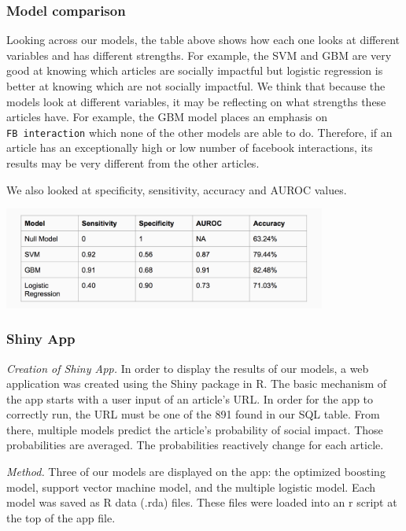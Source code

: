 \documentclass[10pt,letterpaper]{article}
\begin{document}
\hypertarget{model-comparison}{%
\subsubsection{Model comparison}\label{model-comparison}}

Looking across our models, the table above shows how each one looks at
different variables and has different strengths. For example, the SVM
and GBM are very good at knowing which articles are socially impactful
but logistic regression is better at knowing which are not socially
impactful. We think that because the models look at different variables,
it may be reflecting on what strengths these articles have. For example,
the GBM model places an emphasis on \texttt{FB\ interaction} which none
of the other models are able to do. Therefore, if an article has an
exceptionally high or low number of facebook interactions, its results
may be very different from the other articles.

We also looked at specificity, sensitivity, accuracy and AUROC values.

\includegraphics[width=401px]{model-comp}

\hypertarget{shiny-app}{%
\subsubsection{Shiny App}\label{shiny-app}}

\emph{Creation of Shiny App.} In order to display the results of our
models, a web application was created using the Shiny package in R. The
basic mechanism of the app starts with a user input of an article's URL.
In order for the app to correctly run, the URL must be one of the 891
found in our SQL table. From there, multiple models predict the
article's probability of social impact. Those probabilities are
averaged. The probabilities reactively change for each article.

\emph{Method.} Three of our models are displayed on the app: the
optimized boosting model, support vector machine model, and the multiple
logistic model. Each model was saved as R data (.rda) files. These files
were loaded into an r script at the top of the app file.
\end{document}
